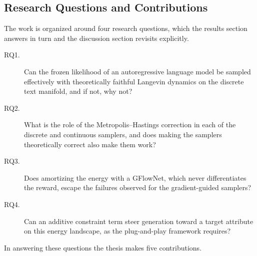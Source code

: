 %
%

\subsection{Research Questions and Contributions}
\label{sec:intro-rqs}

The work is organized around four research questions, which the results section answers in turn and the discussion section revisits explicitly.

\begin{description}
    \item[RQ1.] Can the frozen likelihood of an autoregressive language model be sampled effectively with theoretically faithful Langevin dynamics on the discrete text manifold, and if not, why not?
    \item[RQ2.] What is the role of the Metropolis--Hastings correction in each of the discrete and continuous samplers, and does making the samplers theoretically correct also make them work?
    \item[RQ3.] Does amortizing the energy with a GFlowNet, which never differentiates the reward, escape the failures observed for the gradient-guided samplers?
    \item[RQ4.] Can an additive constraint term steer generation toward a target attribute on this energy landscape, as the plug-and-play framework requires?
\end{description}

In answering these questions the thesis makes five contributions.

